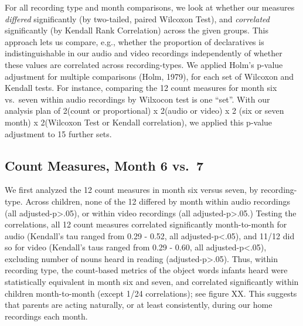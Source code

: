 \documentclass[man]{apa6}
\theoremstyle{definition}
\theoremstyle{definition}
\theoremstyle{definition}
\theoremstyle{remark}
\begin{document}
For all recording type and month comparisons, we look at whether our
measures \emph{differed} significantly (by two-tailed, paired Wilcoxon
Test), and \emph{correlated} significantly (by Kendall Rank Correlation)
across the given groups. This approach lets us compare, e.g., whether
the proportion of declaratives is indistinguishable in our audio and
video recordings independently of whether these values are correlated
across recording-types. We applied Holm's p-value adjustment for
multiple comparisons (Holm, 1979), for each set of Wilcoxon and Kendall
tests. For instance, comparing the 12 count measures for month six
vs.~seven within audio recordings by Wilxocon test is one \enquote{set}.
With our analysis plan of 2(count or proportional) x 2(audio or video) x
2 (six or seven month) x 2(Wilcoxon Test or Kendall correlation), we
applied this p-value adjustment to 15 further sets.

\subsection{Count Measures, Month 6
vs.~7}\label{count-measures-month-6-vs.7}

We first analyzed the 12 count measures in month six versus seven, by
recording-type. Across children, none of the 12 differed by month within
audio recordings (all adjusted-p\textgreater{}.05), or within video
recordings (all adjusted-p\textgreater{}.05.) Testing the correlations,
all 12 count measures correlated significantly month-to-month for audio
(Kendall's tau ranged from 0.29 - 0.52, all adjusted-p\textless{}.05),
and 11/12 did so for video (Kendall's taus ranged from 0.29 - 0.60, all
adjusted-p\textless{}.05), excluding number of nouns heard in reading
(adjusted-p\textgreater{}.05). Thus, within recording type, the
count-based metrics of the object words infants heard were statistically
equivalent in month six and seven, and correlated significantly within
children month-to-month (except 1/24 correlations); see figure XX. This
suggests that parents are acting naturally, or at least consistently,
during our home recordings each month.
\end{document}
